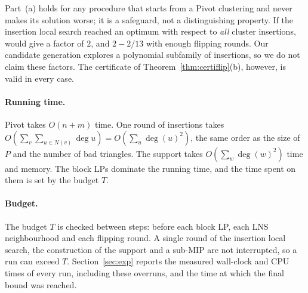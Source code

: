 \begin{remark}
Part~(a) holds for any procedure that starts from a Pivot clustering and never
makes its solution worse; it is a safeguard, not a distinguishing property.
If the insertion local search reached an optimum with respect to
\emph{all} cluster insertions, \citet{CohenAddadLPTYZ24} would give a factor of
$2$, and $2-2/13$ with enough flipping rounds.  Our candidate generation
explores a polynomial subfamily of insertions, so we do not claim these
factors.  The certificate of Theorem~\ref{thm:certiflip}(b), however, is
valid in every case.
\end{remark}

\paragraph{Running time.}  Pivot takes $O(n+m)$ time.  One round of insertions
takes $O(\sum_v\sum_{u\in N(v)}\deg u)=O(\sum_u\deg(u)^2)$, the same order as
the size of $P$ and the number of bad triangles.  The support takes
$O(\sum_w\deg(w)^2)$ time and memory.  The block LPs dominate the running
time, and the time spent on them is set by the budget $T$.


\paragraph{Budget.}  The budget $T$ is checked between steps: before each
block LP, each LNS neighbourhood and each flipping round.  A single round of
the insertion local search, the construction of the support and a sub-MIP
are not interrupted, so a run can exceed $T$.  Section~\ref{sec:exp} reports
the measured wall-clock and CPU times of every run, including these overruns,
and the time at which the final bound was reached.
